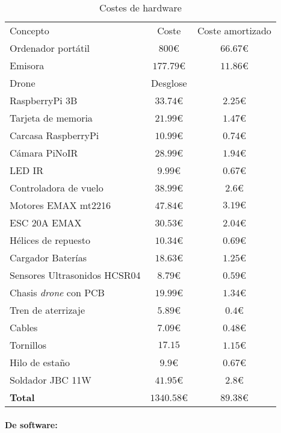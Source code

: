 \begin{table}
	\begin{center}
		\begin{tabular}{l  c  c}\hline
			\toprule
			Concepto & Coste & Coste amortizado\\
			\otoprule
			Ordenador portátil & $800 $\euro & $66.67 $\euro\\
			Emisora & $177.79 $\euro & $11.86 $\euro\\
			Drone & Desglose & \\
			RaspberryPi 3B & $33.74 $\euro & $2.25 $\euro\\
			Tarjeta de memoria & $21.99 $\euro & $1.47 $\euro\\
			Carcasa RaspberryPi & $10.99 $\euro & $0.74 $\euro\\
			Cámara PiNoIR & $28.99 $\euro & $1.94 $\euro\\
			LED IR & $9.99 $\euro & $0.67 $\euro\\
			Controladora de vuelo & $38.99 $\euro & $2.6 $\euro\\
			Motores EMAX mt2216 & $47.84 $\euro &$3.19 \euro $\\
			ESC 20A EMAX & $30.53$\euro & $2.04 $\euro\\
			Hélices de repuesto & $10.34 $\euro & $0.69 $\euro\\
			Cargador Baterías & $18.63 $\euro & $1.25$\euro\\
			Sensores Ultrasonidos HCSR04 & $8.79$\euro & $0.59$\euro\\
			Chasis \emph{drone} con PCB & $19.99 $\euro & $1.34 $\euro\\
			Tren de aterrizaje & $5.89 $\euro & $0.4$\euro\\
			Cables & $7.09$\euro & $0.48$\euro\\
			Tornillos & $17.15$ & $1.15$\euro\\
			Hilo de estaño & $9.9$\euro & $0.67$\euro\\
			Soldador JBC 11W & $41.95$\euro & $2.8$\euro\\
			\hline
			\textbf{Total} & $1340.58 $\euro & $89.38$\euro\\
			\bottomrule
		\end{tabular}
		\caption{Costes de hardware}
		\label{tb:costesHardware}
	\end{center}
\end{table}


\paragraph{De software:}

